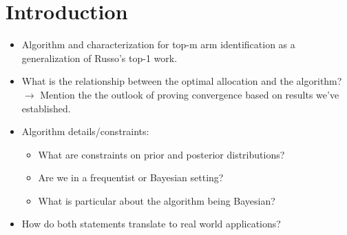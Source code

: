 \newcommand{\package}{\emph}

\chapter{Introduction}

\begin{itemize}
  \item Algorithm and characterization for top-m arm identification as a generalization of Russo's top-1 work.
  \item What is the relationship between the optimal allocation and the algorithm?
  $\rightarrow$ Mention the the outlook of proving convergence based on results
  we've established.
  \item Algorithm details/constraints:
  \begin{itemize}
    \item What are constraints on prior and posterior distributions?
    \item Are we in a frequentist or Bayesian setting?
    \item What is particular about the algorithm being Bayesian?
  \end{itemize}
  \item How do both statements translate to real world applications?
\end{itemize}
